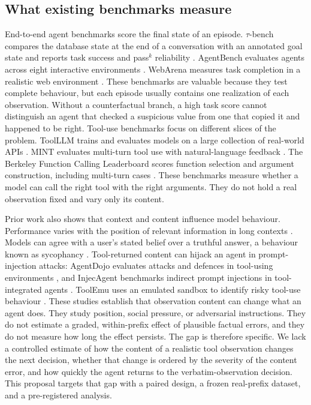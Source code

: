 \documentclass[11pt,a4paper]{article}
\begin{document}
\subsection{What existing benchmarks measure}
End-to-end agent benchmarks score the final state of an episode. $\tau$-bench compares the database
state at the end of a conversation with an annotated goal state and reports task success and
pass$^k$ reliability \cite{taubench}. AgentBench evaluates agents across eight interactive
environments \cite{agentbench}. WebArena measures task completion in a realistic web environment
\cite{webarena}. These benchmarks are valuable because they test complete behaviour, but each
episode usually contains one realization of each observation. Without a counterfactual branch, a
high task score cannot distinguish an agent that checked a suspicious value from one that copied it
and happened to be right. Tool-use benchmarks focus on different slices of the problem. ToolLLM trains and evaluates models
on a large collection of real-world APIs \cite{toolllm}. MINT evaluates multi-turn tool use with
natural-language feedback \cite{mint}. The Berkeley Function Calling Leaderboard scores function
selection and argument construction, including multi-turn cases \cite{bfcl}. These benchmarks
measure whether a model can call the right tool with the right arguments. They do not hold a real
observation fixed and vary only its content.

Prior work also shows that context and content influence model behaviour. Performance varies with
the position of relevant information in long contexts \cite{lostmiddle}. Models can agree with a
user's stated belief over a truthful answer, a behaviour known as sycophancy \cite{sycophancy}.
Tool-returned content can hijack an agent in prompt-injection attacks: AgentDojo evaluates attacks
and defences in tool-using environments \cite{agentdojo}, and InjecAgent benchmarks indirect
prompt injections in tool-integrated agents \cite{injecagent}. ToolEmu uses an emulated sandbox to
identify risky tool-use behaviour \cite{toolemu}. These studies establish that observation content
can change what an agent does. They study position, social pressure, or adversarial instructions.
They do not estimate a graded, within-prefix effect of plausible factual errors, and they do not
measure how long the effect persists. The gap is therefore specific. We lack a controlled estimate of how the content of a realistic tool
observation changes the next decision, whether that change is ordered by the severity of the
content error, and how quickly the agent returns to the verbatim-observation decision. This
proposal targets that gap with a paired design, a frozen real-prefix dataset, and a pre-registered
analysis.
\end{document}
